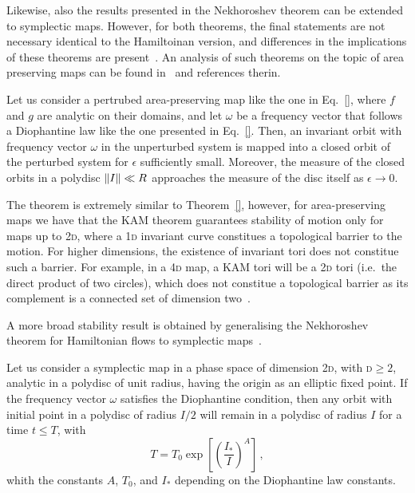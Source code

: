 Likewise, also the results presented in the Nekhoroshev theorem can be extended to symplectic maps. However, for both theorems, the final statements are not necessary identical to the Hamiltoinan version, and differences in the implications of these theorems are present~\cite{}. An analysis of such theorems on the topic of area preserving maps can be found in~\cite{} and references therin.

\begin{theorem}
    Let us consider a pertrubed area-preserving map like the one in Eq.~\eqref{}, where $f$ and $g$ are analytic on their domains, and let $\omega$ be a frequency vector that follows a Diophantine law like the one presented in Eq.~\eqref{}. Then, an invariant orbit with frequency vector $\omega$ in the unperturbed system is mapped into a closed orbit of the perturbed system for $\epsilon$ sufficiently small. Moreover, the measure of the closed orbits in a polydisc $\norm{I} \ll R$ approaches the measure of the disc itself as $\epsilon \to 0$. 
\end{theorem}

The theorem is extremely similar to Theorem~\ref{}, however, for area-preserving maps we have that the KAM theorem guarantees stability of motion only for maps up to 2\textsc{d}, where a 1\textsc{d} invariant curve constitues a topological barrier to the motion. For higher dimensions, the existence of invariant tori does not constitue such a barrier. For example, in a 4\textsc{d} map, a KAM tori will be a 2\textsc{d} tori (i.e.\ the direct product of two circles), which does not constitue a topological barrier as its complement is a connected set of dimension two~\cite{}.

A more broad stability result is obtained by generalising the Nekhoroshev theorem for Hamiltonian flows to symplectic maps~\cite{}.

\begin{theorem}
    Let us consider a symplectic map in a phase space of dimension 2\textsc{d}, with \textsc{d}$\geq 2$, analytic in a polydisc of unit radius, having the origin as an elliptic fixed point. If the frequency vector $\omega$ satisfies the Diophantine condition, then any orbit with initial point in a polydisc of radius $I/2$ will remain in a polydisc of radius $I$ for a time $t\leq T$, with
    \begin{equation}
        T = T_0 \exp\left[\left(\frac{I_\ast}{I}\right)^A\right]\,,
    \end{equation}
    whith the constants $A$, $T_0$, and $I_\ast$ depending on the Diophantine law constants.
\end{theorem}